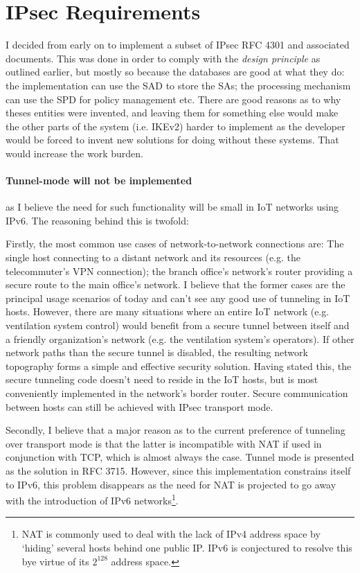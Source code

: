 \documentclass[final,a4paper,twoside,11pt,onecolumn]{report}
\begin{document}
\section{IPsec Requirements}

I decided from early on to implement a subset of IPsec RFC 4301 and associated documents. This was done in order to comply with the \emph{design principle} as outlined earlier, but mostly so because the databases are good at what they do: the implementation can use the SAD to store the SAs; the processing mechanism can use the SPD for policy management etc. There are good reasons as to why theses entities were invented, and leaving them for something else would make the other parts of the system (i.e. IKEv2) harder to implement as the developer would be forced to invent new solutions for doing without these systems. That would increase the work burden.

\paragraph{Tunnel-mode will not be implemented} as I believe the need for such functionality will be small in IoT networks using IPv6. The reasoning behind this is twofold:
\label{para:tunnel-mode-not-impl}

Firstly, the most common use cases of network-to-network connections are: The single host connecting to a distant network and its resources (e.g. the telecommuter's VPN connection); the branch office's network's router providing a secure route to the main office's network. I believe that the former cases are the principal usage scenarios of today and can't see any good use of tunneling in IoT hosts. However, there are many situations where an entire IoT network (e.g. ventilation system control) would benefit from a secure tunnel between itself and a friendly organization's network (e.g. the ventilation system's operators). If other network paths than the secure tunnel is disabled, the resulting network topography forms a simple and effective security solution. Having stated this, the secure tunneling code doesn't need to reside in the IoT hosts, but is most conveniently implemented in the network's border router. Secure communication between hosts can still be achieved with IPsec transport mode.

Secondly, I believe that a major reason as to the current preference of tunneling over transport mode is that the latter is incompatible with NAT if used in conjunction with TCP, which is almost always the case. Tunnel mode is presented as the solution in RFC 3715\cite[2.1.b)]{rfc3715}. However, since this implementation constrains itself to IPv6, this problem disappears as the need for NAT is projected to go away with the introduction of IPv6 networks\footnote{NAT is commonly used to deal with the lack of IPv4 address space by `hiding' several hosts behind one public IP. IPv6 is conjectured to resolve this bye virtue of its $2^{128}$ address space.}.
\end{document}
